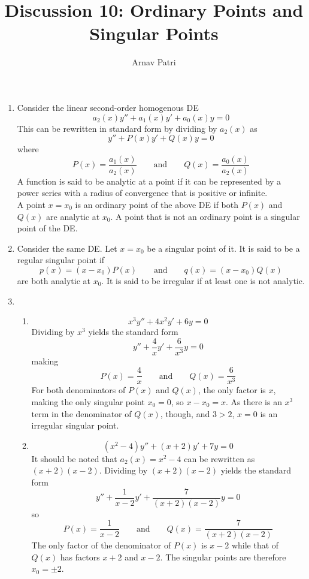 \documentclass[12pt]{article}
\title{Discussion 10: Ordinary Points and Singular Points}
\author{Arnav Patri}
\begin{document}
	\maketitle
		\begin{enumerate}
			\item
				Consider the linear second-order homogenous DE
					\[a_2(x)y'' + a_1(x)y' + a_0(x)y = 0\]
					This can be rewritten in standard form by dividing by \(a_2(x)\) as
					\[y'' + P(x)y' + Q(x)y = 0\]
					where
					\[
						P(x) = \frac{a_1(x)}{a_2(x)} \qquad \text{and} \qquad
						Q(x) = \frac{a_0(x)}{a_2(x)}
					\]
					A function is said to be analytic at a point if it can be represented by a power series with a radius of convergence that is positive or infinite. \\
					A point \(x = x_0\) is an ordinary point of the above DE if both \(P(x)\) and \(Q(x)\) are analytic at \(x_0\). A point that is not an ordinary point is a singular point of the DE.
			\item
				Consider the same DE. Let \(x = x_0\) be a singular point of it. It is said to be a regular singular point if
					\[
						p(x) = (x - x_0)P(x) \qquad \text{and} \qquad
						q(x) = (x - x_0)Q(x)
					\]
					are both analytic at \(x_0\). It is said to be irregular if at least one is not analytic.
			\item
				\begin{enumerate}[1)]
					\item
						\[x^3y'' + 4x^2y' + 6y = 0\]
							Dividing by \(x^3\) yields the standard form
								\[y'' + \frac{4}{x}y' + \frac{6}{x^3}y = 0\]
								making
								\[
									P(x) = \frac{4}{x} \qquad \text{and} \qquad
									Q(x) = \frac{6}{x^3}
								\]
								For both denominators of \(P(x)\) and \(Q(x)\), the only factor is \(x\), making the only singular point \(x_0 = 0\), so \(x - x_0 = x\). As there is an \(x^3\) term in the denominator of \(Q(x)\), though, and \(3 > 2\), \(x = 0\) is an irregular singular point.
					\item
						\[\left(x^2 - 4\right)y'' + (x + 2)y' + 7y = 0\]
							It should be noted that \(a_2(x) = x^2 - 4\) can be rewritten as \((x + 2)(x - 2)\). Dividing by \((x + 2)(x - 2)\) yields the standard form
								\[y'' + \frac{1}{x - 2}y' + \frac{7}{(x + 2)(x - 2)}y = 0\]
								so
								\[
									P(x) = \frac{1}{x - 2} \qquad \text{and} \qquad
									Q(x) = \frac{7}{(x + 2)(x - 2)}
								\]
								The only factor of the denominator of \(P(x)\) is \(x - 2\) while that of \(Q(x)\) has factors \(x + 2\) and \(x - 2\). The singular points are therefore \(x_0 = \pm 2\). \\

\end{enumerate}
\end{enumerate}
\end{document}
